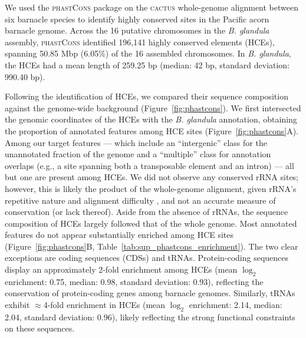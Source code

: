 \documentclass[11pt]{article}
\newcommand{\bgla}{\textit{B. glandula}\xspace}
\begin{document}

We used the \textsc{phastCons} package \citep{siepel_evolutionarily_2005} on the
\textsc{cactus} whole-genome alignment \citep{armstrong_progressive_2020} between
six barnacle species to identify highly conserved sites in the Pacific acorn barnacle
genome. Across the 16 putative chromosomes in the \textit{B. glandula} assembly,
\textsc{phastCons} identified 196,141 highly conserved elements (HCEs), spanning
50.85 Mbp (6.05\%) of the 16 assembled chromosomes.
In \textit{B. glandula}, the HCEs had a mean length of 259.25 bp (median: 42 bp,
standard deviation: 990.40 bp).
\vspace{0.2cm}

Following the identification of HCEs, we compared their sequence composition against
the genome-wide background (Figure~\ref{fig:phastcons}).
We first intersected the genomic coordinates of the HCEs with the \bgla{}
annotation, obtaining the proportion of annotated features among HCE sites
(Figure~\ref{fig:phastcons}A). Among our target features — which include an
``intergenic'' class for the unannotated fraction of the genome and a ``multiple''
class for annotation overlaps (e.g., a site spanning both a transposable element
and an intron) — all but one are present among HCEs. We did not observe any conserved
rRNA sites; however, this is likely the product of the whole-genome alignment, given
rRNA's repetitive nature and alignment difficulty \citep{gillespie_characterizing_2004},
and not an accurate measure of conservation (or lack thereof).
Aside from the absence of rRNAs, the sequence composition of HCEs largely followed that of
the whole genome.
Most annotated features do not appear substantially enriched among HCE sites
(Figure~\ref{fig:phastcons}B, Table~\ref{tab:sup_phastcons_enrichment}).
The two clear exceptions are coding sequences (CDSs) and tRNAs.
Protein-coding sequences display an approximately 2-fold enrichment among HCEs (mean
$\log_2$ enrichment: 0.75, median: 0.98, standard deviation: 0.93), reflecting the
conservation of protein-coding genes among barnacle genomes.
Similarly, tRNAs exhibit $\approx$4-fold enrichment in HCEs (mean $\log_2$ enrichment: 2.14,
median: 2.04, standard deviation: 0.96), likely reflecting the strong functional constraints
on these sequences.
\vspace{0.2cm}
\end{document}
